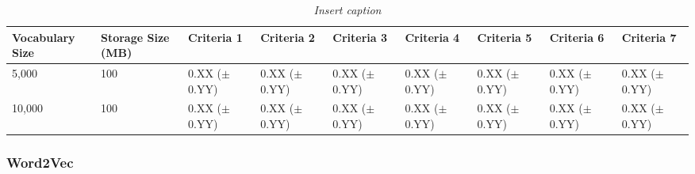 \documentclass[a4paper,twoside,phd]{BYUPhys}
\begin{document}
\begin{table}[H]
	\centering
	\begin{tabular}{|p{1.7cm}|p{1.65cm}|p{1.65cm}|p{1.65cm}|p{1.6cm}|p{1.65cm}|p{1.65cm}|p{1.65cm}|p{1.65cm}|}
		\hline
		Vocabulary Size & Storage Size (MB) & Criteria 1                                                                           & Criteria 2    & Criteria 3 & Criteria 4 & Criteria 5 & Criteria 6 & Criteria 7                                                                                                                                                                                                                                                                                                                                                          \\
		\hline      
		
		5,000  & 100 & 0.XX \newline ($\pm$ 0.YY) & 0.XX \newline ($\pm$ 0.YY) & 0.XX \newline ($\pm$ 0.YY) & 0.XX \newline ($\pm$ 0.YY) & 0.XX \newline ($\pm$ 0.YY)  & 0.XX \newline ($\pm$ 0.YY)   & 0.XX \newline ($\pm$ 0.YY)  \\
		\hline
		
		10,000  & 100 & 0.XX \newline ($\pm$ 0.YY) & 0.XX \newline ($\pm$ 0.YY) & 0.XX \newline ($\pm$ 0.YY) & 0.XX \newline ($\pm$ 0.YY) & 0.XX \newline ($\pm$ 0.YY)  & 0.XX \newline ($\pm$ 0.YY)   & 0.XX \newline ($\pm$ 0.YY)  \\
		\hline 
		
		
		
	\end{tabular}
	\caption{\textit{Insert caption}}
	\label{table:TFIDFStorage}
\end{table}

\subsubsection{Word2Vec}
\end{document}

